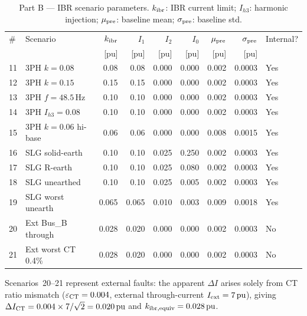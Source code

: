 \documentclass[11pt,a4paper]{article}
\begin{document}
\begin{table}[h!]
\centering
\caption{Part B — IBR scenario parameters.
         $k_{\rm ibr}$: IBR current limit; $I_{h3}$: harmonic injection;
         $\mu_{\rm pre}$: baseline mean; $\sigma_{\rm pre}$: baseline std.}
\label{tab:scenarios}
\setlength{\tabcolsep}{4pt}
\begin{tabular}{llrrrrrrl}
\toprule
\# & Scenario & $k_{\rm ibr}$ & $I_1$ & $I_2$ & $I_0$
   & $\mu_{\rm pre}$ & $\sigma_{\rm pre}$ & Internal? \\
   &          & [pu]          & [pu]  & [pu]  & [pu]
   & [pu]            & [pu]              & \\
\midrule
11 & 3PH $k=0.08$       & 0.08  & 0.08  & 0.000 & 0.000 & 0.002 & 0.0003 & Yes \\
12 & 3PH $k=0.15$       & 0.15  & 0.15  & 0.000 & 0.000 & 0.002 & 0.0003 & Yes \\
13 & 3PH $f=48.5$\,Hz   & 0.10  & 0.10  & 0.000 & 0.000 & 0.002 & 0.0003 & Yes \\
14 & 3PH $I_{h3}=0.08$  & 0.10  & 0.10  & 0.000 & 0.000 & 0.002 & 0.0003 & Yes \\
15 & 3PH $k=0.06$ hi-base & 0.06 & 0.06 & 0.000 & 0.000 & 0.008 & 0.0015 & Yes \\
16 & SLG solid-earth    & 0.10  & 0.10  & 0.025 & 0.250 & 0.002 & 0.0003 & Yes \\
17 & SLG R-earth        & 0.10  & 0.10  & 0.025 & 0.080 & 0.002 & 0.0003 & Yes \\
18 & SLG unearthed      & 0.10  & 0.10  & 0.025 & 0.005 & 0.002 & 0.0003 & Yes \\
19 & SLG worst unearth  & 0.065 & 0.065 & 0.010 & 0.003 & 0.009 & 0.0018 & Yes \\
20 & Ext Bus\_B through  & 0.028 & 0.020 & 0.000 & 0.000 & 0.002 & 0.0003 & No  \\
21 & Ext worst CT 0.4\% & 0.028 & 0.020 & 0.000 & 0.000 & 0.002 & 0.0003 & No  \\
\bottomrule
\end{tabular}
\end{table}

Scenarios~20--21 represent external faults: the apparent $\Delta I$ arises
solely from CT ratio mismatch ($\varepsilon_{\rm CT} = 0.004$, external
through-current $I_{\rm ext} = 7\,\text{pu}$), giving
$\Delta I_{\rm CT} = 0.004 \times 7 / \sqrt{2} = 0.020\,\text{pu}$
and $k_{\rm ibr,equiv} = 0.028\,\text{pu}$.

\end{document}
